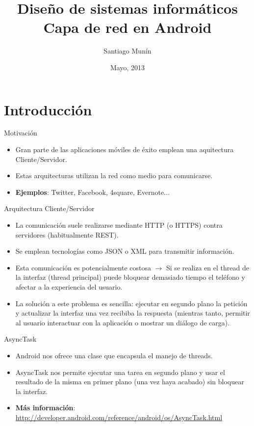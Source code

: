 \documentclass{beamer}
\title[Android network layer design]{Diseño de sistemas informáticos\\Capa de red en Android}
\author{Santiago Munín}
\institute{Universidade da Coruña}
\date{Mayo, 2013}
\begin{document}
\begin{frame}
\titlepage
\end{frame}

\section{Introducción}
\begin{frame}{Motivación}
\begin{itemize}
\item Gran parte de las aplicaciones móviles de éxito emplean una aquitectura Cliente/Servidor.
\item Estas arquitecturas utilizan la red como medio para comunicarse.
\item {\bf Ejemplos}: Twitter, Facebook, 4square, Evernote...
\end{itemize}
\end{frame}

\begin{frame}{Arquitectura Cliente/Servidor}
\begin{itemize}
\item La comunicación suele realizarse mediante HTTP (o HTTPS) contra servidores (habitualmente REST).
\item Se emplean tecnologías como JSON o XML para transmitir información.
\item Esta comunicación es potencialmente costosa $\rightarrow$ Si se realiza en el thread de la interfaz (thread principal) puede bloquear demasiado tiempo el teléfono y afectar a la experiencia del usuario.
\item La solución a este problema es sencilla: ejecutar en segundo plano la petición y actualizar la interfaz una vez recibiba la respuesta (mientras tanto, permitir al usuario interactuar con la aplicación o mostrar un diálogo de carga).
\end{itemize}
\end{frame}

\begin{frame}{AsyncTask}
\begin{itemize}
\item Android nos ofrece una clase que encapsula el manejo de threads.
\item AsyncTask nos permite ejecutar una tarea en segundo plano y usar el resultado de la misma en primer plano (una vez haya acabado) sin bloquear la interfaz.
\item {\bf Más información}: \url{http://developer.android.com/reference/android/os/AsyncTask.html}
\end{itemize}
\end{frame}
\end{document}
